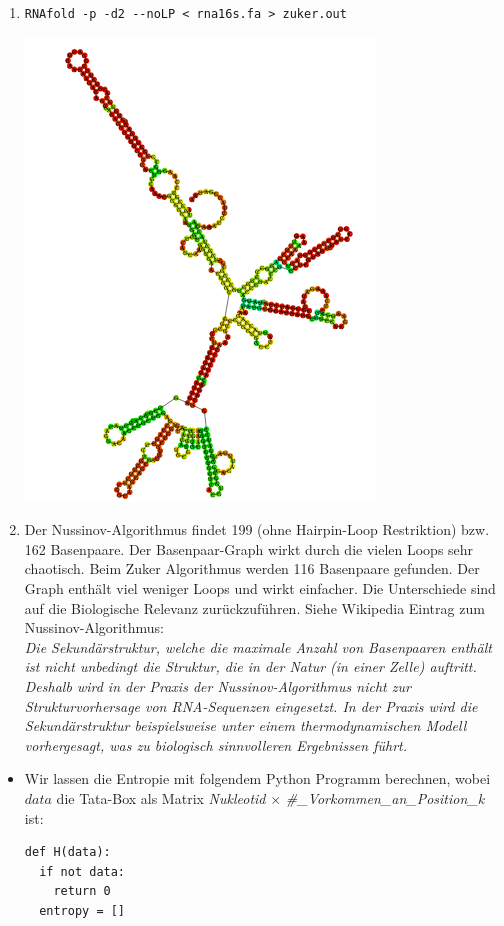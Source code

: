 \documentclass{homework}
\begin{document}
\begin{enumerate}
\begin{enumerate}
\item
\begin{verbatim}
RNAfold -p -d2 --noLP < rna16s.fa > zuker.out
\end{verbatim}

\includegraphics[scale=0.5]{../data/u8_aufg27_zuker_output}

\item
Der Nussinov-Algorithmus findet 199 (ohne Hairpin-Loop Restriktion) bzw. 162 Basenpaare. Der Basenpaar-Graph wirkt durch die vielen Loops sehr chaotisch. Beim Zuker Algorithmus werden 116 Basenpaare gefunden. 
Der Graph enthält viel weniger Loops und wirkt einfacher. 
Die Unterschiede sind auf die Biologische Relevanz zurückzuführen. Siehe Wikipedia Eintrag zum Nussinov-Algorithmus:\\
\textit{Die Sekundärstruktur, welche die maximale Anzahl von Basenpaaren enthält ist nicht unbedingt die Struktur, die in der Natur (in einer Zelle) auftritt. Deshalb wird in der Praxis der Nussinov-Algorithmus nicht zur Strukturvorhersage von RNA-Sequenzen eingesetzt. In der Praxis wird die Sekundärstruktur beispielsweise unter einem thermodynamischen Modell vorhergesagt, was zu biologisch sinnvolleren Ergebnissen führt.}

\end{enumerate}


\begin{itemize}
	\item
Wir lassen die Entropie mit folgendem Python Programm berechnen, wobei $data$ die Tata-Box als Matrix \textit{Nukleotid} $\times$ \textit{\#\_Vorkommen\_an\_Position\_k} ist:
\begin{verbatim}
def H(data):
  if not data:
    return 0
  entropy = []
  

\end{verbatim}
\end{itemize}
\end{enumerate}
\end{document}
